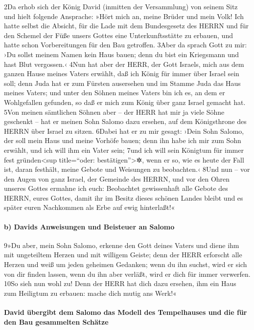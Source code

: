 2Da erhob sich der König David (inmitten der Versammlung) von seinem
Sitz und hielt folgende Ansprache: »Hört mich an, meine Brüder und mein
Volk! Ich hatte selbst die Absicht, für die Lade mit dem Bundesgesetz
des HERRN und für den Schemel der Füße unsers Gottes eine
Unterkunftsstätte zu erbauen, und hatte schon Vorbereitungen für den Bau
getroffen. 3Aber da sprach Gott zu mir: ›Du sollst meinem Namen kein
Haus bauen; denn du bist ein Kriegsmann und hast Blut vergossen.‹ 4Nun
hat aber der HERR, der Gott Israels, mich aus dem ganzen Hause meines
Vaters erwählt, daß ich König für immer über Israel sein soll; denn Juda
hat er zum Fürsten ausersehen und im Stamme Juda das Haus meines Vaters;
und unter den Söhnen meines Vaters bin ich es, an dem er Wohlgefallen
gefunden, so daß er mich zum König über ganz Israel gemacht hat. 5Von
meinen sämtlichen Söhnen aber -- der HERR hat mir ja viele Söhne
geschenkt -- hat er meinen Sohn Salomo dazu ersehen, auf dem
Königsthrone des HERRN über Israel zu sitzen. 6Dabei hat er zu mir
gesagt: ›Dein Sohn Salomo, der soll mein Haus und meine Vorhöfe bauen;
denn ihn habe ich mir zum Sohn erwählt, und ich will ihm ein Vater sein;
7und ich will sein Königtum für immer fest gründen\textless sup
title=``oder: bestätigen''\textgreater✲, wenn er so, wie es heute der
Fall ist, daran festhält, meine Gebote und Weisungen zu beobachten.‹
8Und nun -- vor den Augen von ganz Israel, der Gemeinde des HERRN, und
vor den Ohren unseres Gottes ermahne ich euch: Beobachtet gewissenhaft
alle Gebote des HERRN, eures Gottes, damit ihr im Besitz dieses schönen
Landes bleibt und es später euren Nachkommen als Erbe auf ewig
hinterlaßt!«

\hypertarget{b-davids-anweisungen-und-beisteuer-an-salomo}{%
\paragraph{b) Davids Anweisungen und Beisteuer an
Salomo}\label{b-davids-anweisungen-und-beisteuer-an-salomo}}

9»Du aber, mein Sohn Salomo, erkenne den Gott deines Vaters und diene
ihm mit ungeteiltem Herzen und mit willigem Geiste; denn der HERR
erforscht alle Herzen und weiß um jeden geheimen Gedanken; wenn du ihn
suchst, wird er sich von dir finden lassen, wenn du ihn aber verläßt,
wird er dich für immer verwerfen. 10So sieh nun wohl zu! Denn der HERR
hat dich dazu ersehen, ihm ein Haus zum Heiligtum zu erbauen: mache dich
mutig ans Werk!«

\hypertarget{david-uxfcbergibt-dem-salomo-das-modell-des-tempelhauses-und-die-fuxfcr-den-bau-gesammelten-schuxe4tze}{%
\paragraph{David übergibt dem Salomo das Modell des Tempelhauses und die
für den Bau gesammelten
Schätze}\label{david-uxfcbergibt-dem-salomo-das-modell-des-tempelhauses-und-die-fuxfcr-den-bau-gesammelten-schuxe4tze}}

